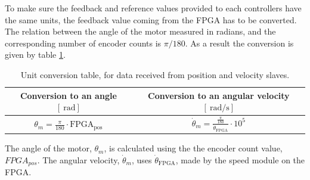 \documentclass[../../main.tex]{subfiles}
\begin{document}
To make sure the feedback and reference values provided to each controllers have the same units, the feedback value coming from the FPGA has to be converted. The relation between the angle of the motor measured in radians, and the corresponding number of encoder counts is $\pi / 180$. As a result the conversion is given by table \ref{tab:conversionposvel}.

\begin{table}[H]
\centering
\begin{tabular}{c|c}
Conversion to an angle $\left[\SI{}{\radian}\right]$ & Conversion to an angular velocity $\left [ \SI{}{\radian \per \second }\right ]$ \\ \hline
 $\theta_{m} = \frac{\pi}{180} \cdot \mathrm{FPGA_{pos}}$ & $\dot{\theta}_{m} = \frac{\frac{\pi}{180}}{ \dot{\theta}_{\mathrm{FPGA}} }\cdot 10^{5}$ 
\end{tabular}
\caption{Unit conversion table, for data received from position and velocity slaves.}
\label{tab:conversionposvel}
\end{table}
The angle of the motor, $\theta_m$, is calculated using the the encoder count value, $FPGA_{pos}$. The angular velocity, $\dot{\theta}_m$, uses $\dot{\theta}_{\mathrm{FPGA}}$, made by the speed module on the FPGA.








\end{document}
